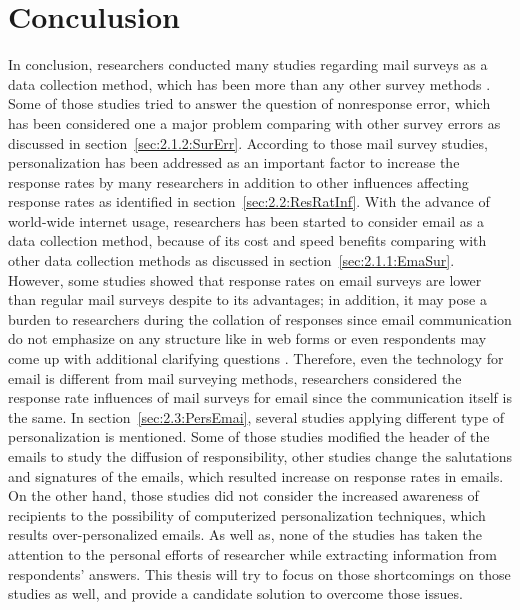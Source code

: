 \section{Conculusion}
\label{sec:2.4:Conc}

In conclusion, researchers conducted many studies regarding mail surveys as a data collection method, which has been more than any other survey methods \citep{Dillman1991}. Some of those studies tried to answer the question of nonresponse error, which has been considered one a major problem comparing with other survey errors as discussed in section~\ref{sec:2.1.2:SurErr}. According to those mail survey studies, personalization has been addressed as an important factor to increase the response rates by many researchers in addition to other influences affecting response rates as identified in section~\ref{sec:2.2:ResRatInf}. With the advance of world-wide internet usage, researchers has been started to consider email as a data collection method, because of its cost and speed benefits comparing with other data collection methods as discussed in section~\ref{sec:2.1.1:EmaSur}. However, some studies showed that response rates on email surveys are lower than regular mail surveys despite to its advantages; in addition, it may pose a burden to researchers during the collation of responses since email communication do not emphasize on any structure like in web forms or even respondents may come up with additional clarifying questions \citep{Selm2006}. Therefore, even the technology for email is different from mail surveying methods, researchers considered the response rate influences of mail surveys for email since the communication itself is the same. In section~\ref{sec:2.3:PersEmai}, several studies applying different type of personalization is mentioned. Some of those studies modified the header of the emails to study the diffusion of responsibility, other studies change the salutations and signatures of the emails, which resulted increase on response rates in emails. On the other hand, those studies did not consider the increased awareness of recipients to the possibility of computerized personalization techniques, which results over-personalized emails. As well as, none of the studies has taken the attention to the personal efforts of researcher while extracting information from respondents' answers. This thesis will try to focus on those shortcomings on those studies as well, and provide a candidate solution to overcome those issues.
\vspace{1cm}


